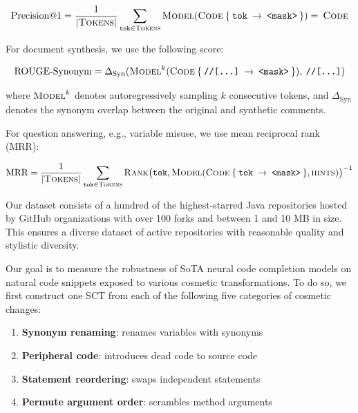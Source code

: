 \documentclass[usenames,dvipsnames]{article} %
\begin{document}
\begin{equation*}
  \text{Precision@1} = \frac{1}{{|\textsc{Tokens}|}}\sum_{\texttt{tok}\in \textsc{Tokens}}\textsc{Model}(\textsc{Code}\:\{\:\texttt{tok}\:\rightarrow\:\texttt{<mask>}\:\}) = \:\textsc{Code}
\end{equation*}

  For document synthesis, we use the following score:

\begin{equation*}
\text{ROUGE-Synonym} = \Delta_{\text{Syn}}(\textsc{Model}^{k}(\textsc{Code}\:\{\:\texttt{//[...]}\:\rightarrow\:\texttt{<mask>}\:\}), \:\texttt{//[...]})
\end{equation*}

  where $\textsc{Model}^{k}$ denotes autoregressively sampling $k$ consecutive tokens, and $\Delta_\text{Syn}$ denotes the synonym overlap between the original and synthetic comments.

  For question answering, e.g., variable misuse, we use mean reciprocal rank (MRR):

\begin{equation*}
\text{MRR} = \frac{1}{|\textsc{Tokens}|} \sum_{\texttt{tok}\in\textsc{Tokens}} \textsc{Rank}\big(\texttt{tok}, \textsc{Model}(\textsc{Code}\:\{\:\texttt{tok}\:\rightarrow\:\texttt{<mask>}\:\}, \textsc{hints})\big)^{-1}
\end{equation*}

  Our dataset consists of a hundred of the highest-starred Java repositories hosted by GitHub organizations with over 100 forks and between 1 and 10 MB in size. This ensures a diverse dataset of active repositories with reasonable quality and stylistic diversity.

  Our goal is to measure the robustness of SoTA neural code completion models on natural code snippets exposed to various cosmetic transformations. To do so, we first construct one SCT from each of the following five categories of cosmetic changes:

  \begin{enumerate}[itemsep=1ex]
    \item \textbf{Synonym renaming}: renames variables with synonyms
    \item \textbf{Peripheral code}: introduces dead code to source code
    \item \textbf{Statement reordering}: swaps independent statements
    \item \textbf{Permute argument order}: scrambles method arguments
  \end{enumerate}
\end{document}
